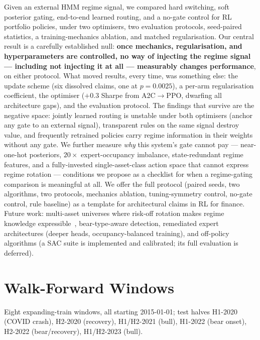 \documentclass[sigconf,anonymous,review]{acmart}
\begin{document}
Given an external HMM regime signal, we compared hard switching, soft
posterior gating, end-to-end learned routing, and a no-gate control for
RL portfolio policies, under two optimisers, two evaluation protocols,
seed-paired statistics, a training-mechanics ablation, and matched
regularisation. Our central result is a carefully established null:
\textbf{once mechanics, regularisation, and hyperparameters are
controlled, no way of injecting the regime signal --- including not
injecting it at all --- measurably changes performance}, on either
protocol. What moved results, every time, was something else: the
update scheme (six dissolved claims, one at $p{=}0.0025$), a per-arm
regularisation coefficient, the optimiser (${+}0.3$ Sharpe from
A2C$\rightarrow$PPO, dwarfing all architecture gaps), and the
evaluation protocol. The findings that survive are the negative
space: jointly learned routing is unstable under both optimisers
(anchor any gate to an external signal), transparent rules on the same
signal destroy value, and frequently retrained policies carry regime
information in their weights without any gate. We further measure
\emph{why} this system's gate cannot pay --- near-one-hot posteriors,
$20\times$ expert-occupancy imbalance, state-redundant regime features,
and a fully-invested single-asset-class action space that cannot
express regime rotation --- conditions we propose as a checklist for
when a regime-gating comparison is meaningful at all. We offer the
full protocol (paired seeds, two algorithms, two protocols, mechanics
ablation, tuning-symmetry control, no-gate control, rule baseline) as
a template for architectural claims in RL for finance. Future work:
multi-asset universes where risk-off rotation makes regime knowledge
expressible~\cite{ang2002regimes}, bear-type-aware detection,
remediated expert architectures (deeper heads, occupancy-balanced
training), and off-policy algorithms (a SAC suite is implemented and
calibrated; its full evaluation is deferred).





\appendix

\section{Walk-Forward Windows}
\label{app:windows}
Eight expanding-train windows, all starting 2015-01-01; test halves
H1-2020 (COVID crash), H2-2020 (recovery), H1/H2-2021 (bull),
H1-2022 (bear onset), H2-2022 (bear/recovery), H1/H2-2023 (bull).
\end{document}
